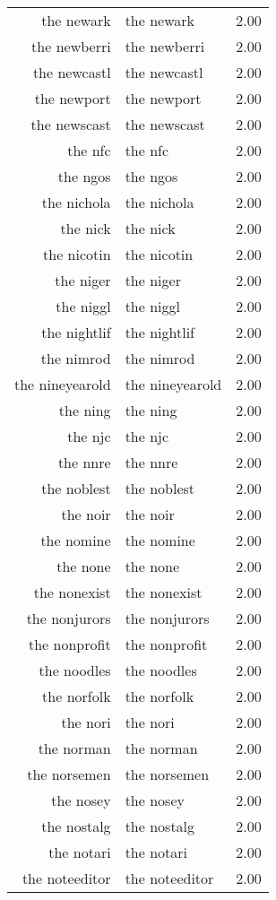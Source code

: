 \begin{table}[ht]
\begin{tabular}{rlr}
  the newark & the newark & 2.00 \\ 
  the newberri & the newberri & 2.00 \\ 
  the newcastl & the newcastl & 2.00 \\ 
  the newport & the newport & 2.00 \\ 
  the newscast & the newscast & 2.00 \\ 
  the nfc & the nfc & 2.00 \\ 
  the ngos & the ngos & 2.00 \\ 
  the nichola & the nichola & 2.00 \\ 
  the nick & the nick & 2.00 \\ 
  the nicotin & the nicotin & 2.00 \\ 
  the niger & the niger & 2.00 \\ 
  the niggl & the niggl & 2.00 \\ 
  the nightlif & the nightlif & 2.00 \\ 
  the nimrod & the nimrod & 2.00 \\ 
  the nineyearold & the nineyearold & 2.00 \\ 
  the ning & the ning & 2.00 \\ 
  the njc & the njc & 2.00 \\ 
  the nnre & the nnre & 2.00 \\ 
  the noblest & the noblest & 2.00 \\ 
  the noir & the noir & 2.00 \\ 
  the nomine & the nomine & 2.00 \\ 
  the none & the none & 2.00 \\ 
  the nonexist & the nonexist & 2.00 \\ 
  the nonjurors & the nonjurors & 2.00 \\ 
  the nonprofit & the nonprofit & 2.00 \\ 
  the noodles & the noodles & 2.00 \\ 
  the norfolk & the norfolk & 2.00 \\ 
  the nori & the nori & 2.00 \\ 
  the norman & the norman & 2.00 \\ 
  the norsemen & the norsemen & 2.00 \\ 
  the nosey & the nosey & 2.00 \\ 
  the nostalg & the nostalg & 2.00 \\ 
  the notari & the notari & 2.00 \\ 
  the noteeditor & the noteeditor & 2.00 \\ 

\end{tabular}
\end{table}
